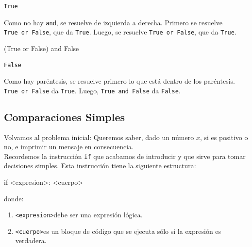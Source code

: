 \documentclass[
  letterpaper,
  DIV=11,
  numbers=noendperiod]{scrreprt}
\newenvironment{Shaded}{\begin{snugshade}}{\end{snugshade}}
\newcommand{\ControlFlowTok}[1]{\textcolor[rgb]{0.00,0.23,0.31}{#1}}
\newcommand{\KeywordTok}[1]{\textcolor[rgb]{0.00,0.23,0.31}{#1}}
\newcommand{\NormalTok}[1]{\textcolor[rgb]{0.00,0.23,0.31}{#1}}
\newcommand{\OperatorTok}[1]{\textcolor[rgb]{0.37,0.37,0.37}{#1}}
\newcommand{\VariableTok}[1]{\textcolor[rgb]{0.07,0.07,0.07}{#1}}
\providecommand{\tightlist}{%
  \setlength{\itemsep}{0pt}\setlength{\parskip}{0pt}}\usepackage{longtable,booktabs,array}
\begin{document}
\begin{tcolorbox}
\begin{verbatim}
True
\end{verbatim}

Como no hay \texttt{and}, se resuelve de izquierda a derecha. Primero se
resuelve \texttt{True\ or\ False}, que da \texttt{True}. Luego, se
resuelve \texttt{True\ or\ False}, que da \texttt{True}.

\begin{Shaded}
\begin{Highlighting}[]
\NormalTok{(}\VariableTok{True} \KeywordTok{or} \VariableTok{False}\NormalTok{) }\KeywordTok{and} \VariableTok{False}
\end{Highlighting}
\end{Shaded}

\begin{verbatim}
False
\end{verbatim}

Como hay paréntesis, se resuelve primero lo que está dentro de los
paréntesis. \texttt{True\ or\ False} da \texttt{True}. Luego,
\texttt{True\ and\ False} da \texttt{False}.

\end{tcolorbox}

\subsection{Comparaciones Simples}\label{comparaciones-simples}

Volvamos al problema inicial: Queremos saber, dado un número \(x\), si
es positivo o no, e imprimir un mensaje en consecuencia.\\
Recordemos la instrucción \texttt{if} que acabamos de introducir y que
sirve para tomar decisiones simples. Esta instrucción tiene la siguiente
estructura:

\begin{Shaded}
\begin{Highlighting}[]
\ControlFlowTok{if} \OperatorTok{\textless{}}\NormalTok{expresion}\OperatorTok{\textgreater{}}\NormalTok{:}
    \OperatorTok{\textless{}}\NormalTok{cuerpo}\OperatorTok{\textgreater{}}
\end{Highlighting}
\end{Shaded}

donde:

\begin{enumerate}
\def\labelenumi{\arabic{enumi}.}
\tightlist
\item
  \texttt{\textless{}expresion\textgreater{}}debe ser una expresión
  lógica.
\item
  \texttt{\textless{}cuerpo\textgreater{}}es un bloque de código que se
  ejecuta sólo si la expresión es verdadera.
\end{enumerate}
\end{document}
